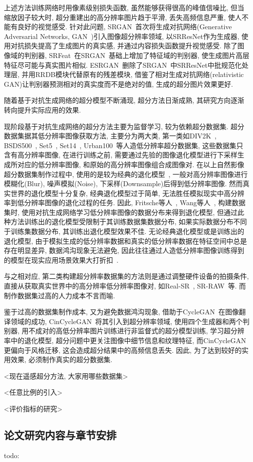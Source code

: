 上述方法训练网络时用像素级别损失函数, 虽然能够获得很高的峰值信噪比, 但当缩放因子较大时, 超分重建出的高分辨率图片趋于平滑, 丢失高频信息严重, 使人不能有良好的视觉感受. 针对此问题, SRGAN~\cite{SRGAN2017}首次将生成对抗网络(Generative Adversarial Networks, GAN~\cite{GAN})引入图像超分辨率领域, 以SRResNet作为生成器, 使用对抗损失提高了生成图片的真实感, 并通过内容损失函数提升视觉感受. 除了图像域的判别器, SRFeat~\cite{SRFeat2018}在SRGAN~\cite{SRGAN2017}基础上增加了特征域的判别器, 使生成图片高层特征尽可能与真实图片相似. ESRGAN~\cite{ESRGAN2018}删除了SRGAN~\cite{SRGAN2017}中SRResNet中批规范化处理层, 并用RRDB模块代替原有的残差模块, 借鉴了相对生成对抗网络(relativistic GAN)让判别器预测相对的真实度而不是绝对的值, 生成的超分图片效果更好. 

随着基于对抗生成网络的超分模型不断涌现, 超分方法日渐成熟, 其研究方向逐渐转向提升实际应用的效果. 

现阶段基于对抗生成网络的超分方法主要为监督学习, 较为依赖超分数据集. 超分数据集据其低分辨率图像获取方法, 主要分为两大类, 第一类如DIV2K~\cite{DIV2K}, BSDS500~\cite{BSDS500}, Set5~\cite{Set5}, Set14~\cite{Set14}, Urban100~\cite{Urban100}等人造低分辨率超分数据集, 这些数据集只含有高分辨率图像, 在进行训练之前, 需要通过先验的图像退化模型进行下采样生成所对应的低分辨率图像, 和原始的高分辨率图像组合成图像对. 在以上自然影像超分数据集制作过程中, 使用的是较为经典的退化模型~\cite{classicDM}, 一般对高分辨率图像进行模糊化(Blur), 噪声模拟(Noise), 下采样(Downsample)后得到低分辨率图像. 然而真实世界的退化模型十分复杂, 经典退化模型过于简单, 无法胜任模拟现实中高分辨率到低分辨率图像的退化过程的任务. 因此, Fritsche等人~\cite{DSGAN}, Wang等人~\cite{DASR}, 构建数据集时, 使用对抗生成网络学习低分辨率图像的数据分布来得到退化模型, 但通过此种方法训练出的退化模型受限制于其训练数据集数据分布, 如果实际数据分布不同于训练集数据分布, 其训练出退化模型效果不佳. 无论经典退化模型或是训练出的退化模型, 由于模拟生成的低分辨率数据和真实的低分辨率数据在特征空间中总是存在明显差异, 数据鸿沟现象无法避免, 因此往往通过人造低分辨率图像训练得到的模型在现实应用场景效果大打折扣~\cite{SupER}.

与之相对应, 第二类构建超分辨率数据集的方法则是通过调整硬件设备的拍摄条件, 直接从获取真实世界中的高分辨率低分辨率图像对, 如Real-SR~\cite{realSR}, SR-RAW~\cite{SR-RAW}等. 而制作数据集过高的人力成本不言而喻. 

鉴于过高的数据集制作成本, 又为避免数据鸿沟现象, 借助于CycleGAN~\cite{CycleGAN2017}在图像翻译领域的成功, CinCycleGAN~\cite{CinCycleGAN2018}将其引入到超分辨率领域, 使用四个生成器和两个判别器, 用不成对的高低分辨率图片训练进行非监督式的超分模型训练, 学习超分辨率中的退化模型, 超分问题中更关注图像中细节信息和纹理特征, 而CinCycleGAN更偏向于风格迁移, 这会造成超分结果中的高频信息丢失. 因此, 为了达到较好的实用效果, 必须制作真实的超分数据集. 

<现在遥感超分方法, 大家用哪些数据集>

<任意比例的引入>

<评价指标的研究>



\subsection{论文研究内容与章节安排}
todo: